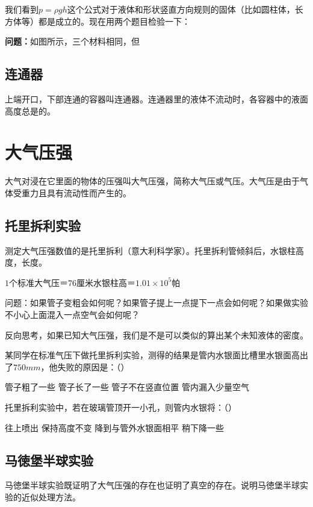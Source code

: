 \documentclass[12pt]{exam}%
\begin{document}
\begin{knowledge}
我们看到$p=\rho gh$这个公式对于液体和形状竖直方向规则的固体（比如圆柱体，长方体等）都是成立的。现在用两个题目检验一下：

\textbf{问题：}如图所示，三个材料相同，但

\subsection{连通器}
上端开口，下部连通的容器叫连通器。连通器里的液体不流动时，各容器中的液面高度总是\answerline*[相同]的。



\section{大气压强}
大气对浸在它里面的物体的压强叫大气压强，简称大气压或气压。大气压是由于气体受重力且具有流动性而产生的。

\subsection{托里拆利实验}
测定大气压强数值的是托里拆利（意大利科学家）。托里拆利管倾斜后，水银柱高度\answerline*[不变]，长度\answerline*[变长]。

$1$个标准大气压＝$76$厘米水银柱高＝$1.01 \times 10^5$帕

问题：如果管子变粗会如何呢？如果管子提上一点提下一点会如何呢？如果做实验不小心上面混入一点空气会如何呢？

反向思考，如果已知大气压强，我们是不是可以类似的算出某个未知液体的密度。

\begin{questions}
\setcounter{question}{2}
\question
某同学在标准气压下做托里拆利实验，测得的结果是管内水银面比槽里水银面高出了$750mm$，他失败的原因是：（\answerline*[D]）
\begin{choices}
\choice 管子粗了一些
\choice 管子长了一些
\choice 管子不在竖直位置
\choice 管内漏入少量空气
\end{choices}

\question
托里拆利实验中，若在玻璃管顶开一小孔，则管内水银将：（\answerline*[C]）
\begin{choices}
\choice 往上喷出
\choice 保持高度不变
\choice 降到与管外水银面相平
\choice 稍下降一些
\end{choices}
\end{questions}


\subsection{马徳堡半球实验}
马徳堡半球实验既证明了大气压强的存在也证明了真空的存在。说明马徳堡半球实验的近似处理方法。


\end{knowledge}
\end{document}
